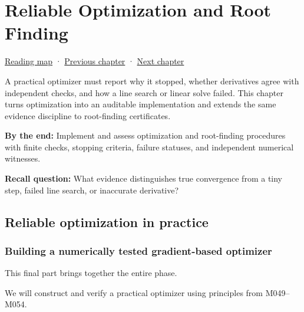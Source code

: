 \chapter{Reliable Optimization and Root Finding}\label{02-foundations-ii-ch028-reliable-optimization-and-root-finding}\hypertarget{02-foundations-ii-ch028}{}\label{stagechapter:02-foundations-ii-ch028}

\hypertarget{02-foundations-ii-ch028-reliable-optimization-and-root-finding}{}

\hyperref[volume-reading-map]{Reading map} · \hyperref[02-foundations-ii-ch027-gaussnewton-for-geometry-and-pose]{Previous chapter} · \hyperref[02-foundations-ii-ch029-discretization-convergence-and-experimental-design]{Next chapter}

A practical optimizer must report why it stopped, whether derivatives agree with independent checks, and how a line search or linear solve failed. This chapter turns optimization into an auditable implementation and extends the same evidence discipline to root-finding certificates.

\textbf{By the end:} Implement and assess optimization and root-finding procedures with finite checks, stopping criteria, failure statuses, and independent numerical witnesses.

\textbf{Recall question:} What evidence distinguishes true convergence from a tiny step, failed line search, or inaccurate derivative?

\section{Reliable optimization in practice}\label{02-foundations-ii-ch028-reliable-optimization-in-practice}

\hypertarget{02-foundations-ii-ch028-reliable-optimization-in-practice}{}

\subsection{Building a numerically tested gradient-based optimizer}\label{02-foundations-ii-ch028-building-a-numerically-tested-gradient-based-optimizer}

\hypertarget{02-foundations-ii-ch028-building-a-numerically-tested-gradient-based-optimizer}{}

This final part brings together the entire phase.

We will construct and verify a practical optimizer using principles from M049--M054.


